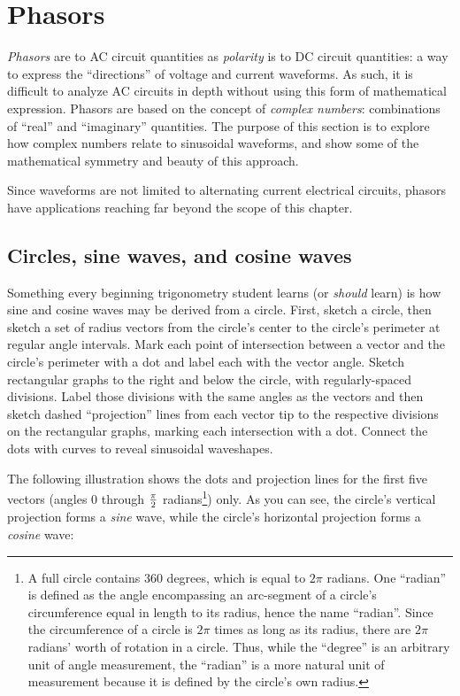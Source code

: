 \filbreak
\section{Phasors}

\textit{Phasors} are to AC circuit quantities as \textit{polarity} is to DC circuit quantities: a way to express the ``directions'' of voltage and current waveforms.  As such, it is difficult to analyze AC circuits in depth without using this form of mathematical expression.  Phasors are based on the concept of \textit{complex numbers}: combinations of ``real'' and ``imaginary'' quantities.  The purpose of this section is to explore how complex numbers relate to sinusoidal waveforms, and show some of the mathematical symmetry and beauty of this approach.      

Since waveforms are not limited to alternating current electrical circuits, phasors have applications reaching far beyond the scope of this chapter.







\filbreak
\subsection{Circles, sine waves, and cosine waves}

Something every beginning trigonometry student learns (or \textit{should} learn) is how sine and cosine waves may be derived from a circle.  First, sketch a circle, then sketch a set of radius vectors from the circle's center to the circle's perimeter at regular angle intervals.  Mark each point of intersection between a vector and the circle's perimeter with a dot and label each with the vector angle.  Sketch rectangular graphs to the right and below the circle, with regularly-spaced divisions.  Label those divisions with the same angles as the vectors and then sketch dashed ``projection'' lines from each vector tip to the respective divisions on the rectangular graphs, marking each intersection with a dot.  Connect the dots with curves to reveal sinusoidal waveshapes.

The following illustration shows the dots and projection lines for the first five vectors (angles 0 through $\pi \over 2$ radians\footnote{A full circle contains 360 degrees, which is equal to $2 \pi$ radians.  One ``radian'' is defined as the angle encompassing an arc-segment of a circle's circumference equal in length to its radius, hence the name ``radian''.  Since the circumference of a circle is $2 \pi$ times as long as its radius, there are $2 \pi$ radians' worth of rotation in a circle.  Thus, while the ``degree'' is an arbitrary unit of angle measurement, the ``radian'' is a more natural unit of measurement because it is defined by the circle's own radius.}) only.  As you can see, the circle's vertical projection forms a \textit{sine} wave, while the circle's horizontal projection forms a \textit{cosine} wave:

